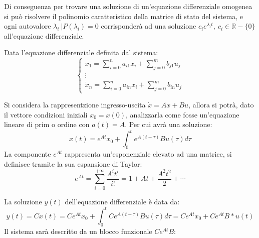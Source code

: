 \documentclass{article}
\numberwithin{equation}{subsection}
\begin{document}
Di conseguenza per trovare una soluzione di un'equazione differenziale omogenea si può risolvere il polinomio caratteristico della matrice di stato del sistema, e ogni 
autovalore $\lambda_i\:\Big|P(\lambda_i)=0$ corrisponderà ad una soluzione $c_ie^{\lambda_it},\:c_i\in\mathbb{R}-\{0\}$ all'equazione differenziale. 


Data l'equazione differenziale definita dal sistema:
\begin{equation}
    \begin{cases}
        \dot x_1=\displaystyle\sum_{i=0}^na_{i1}x_i+\sum_{j=0}^mb_{j1}u_j\\
        \vdots\\
        \dot x_n=\displaystyle\sum_{i=0}^na_{in}x_i+\sum_{j=0}^mb_{in}u_j
    \end{cases}
\end{equation}

Si considera la rappresentzione ingresso-uscita $\dot x=Ax+Bu$, allora si potrà, dato il vettore condizioni iniziali $x_0=x(0)$, analizzarla come fosse un'equazione lineare 
di prim o ordine con $a(t)=A$. Per cui avrà una soluzione:
\begin{equation}
    x(t)=e^{At}x_0+\displaystyle\int_{0}^te^{A(t-\tau)}Bu(\tau)d\tau
\end{equation} 
La componente $e^{At}$ rappresenta un'esponenziale elevato ad una matrice, si definisce tramite la sua espansione di Taylor: 
\begin{equation}
    e^{At}=\displaystyle\sum_{i=0}^{+\infty}\frac{A^it^i}{i!}=1+At+\frac{A^2t^2}{2}+\cdots
\end{equation}

La soluzione $y(t)$ dell'equazione differenziale è data da:
\begin{equation}
    y(t)=Cx(t)=Ce^{At}x_0+\displaystyle\int_{0}^tCe^{A(t-\tau)}Bu(\tau)d\tau=Ce^{At}x_0+Ce^{At}B*u(t)
\end{equation}
Il sistema sarà descritto da un blocco funzionale $Ce^{At}B$:
\begin{center}
\end{center}
\end{document}
